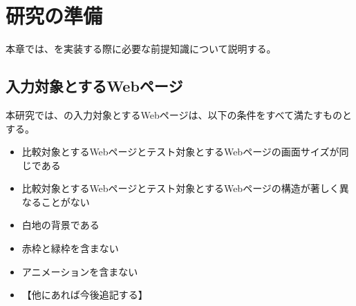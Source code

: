 \chapter{研究の準備}\label{cha:Preparation}
本章では、\toolName を実装する際に必要な前提知識について説明する。

\section{入力対象とするWebページ}\label{sec:target_images}
本研究では、\toolName の入力対象とするWebページは、以下の条件をすべて満たすものとする。
\begin{itemize}
      \setlength{\itemsep}{0pt}
            \setlength{\parsep}{0pt}
      \item 比較対象とするWebページとテスト対象とするWebページの画面サイズが同じである
      \item 比較対象とするWebページとテスト対象とするWebページの構造が著しく異なることがない
      \item 白地の背景である
      \item 赤枠と緑枠を含まない
      \item アニメーションを含まない
      \item 【他にあれば今後追記する】
\end{itemize}

